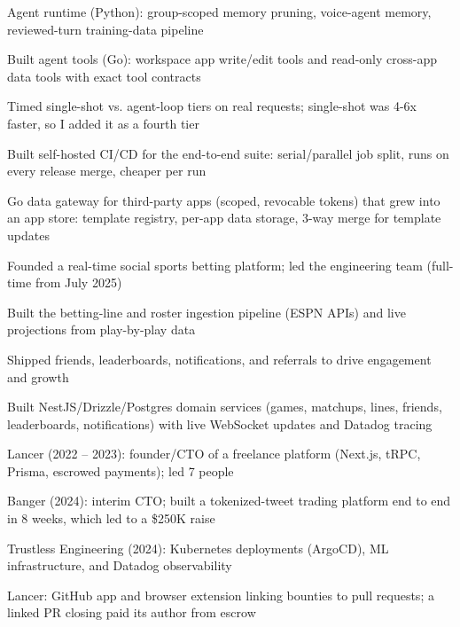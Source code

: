 \documentclass[print]{jack-resume}
\begin{document}
\begin{tightemize}
    \item Agent runtime (Python): group-scoped memory pruning, voice-agent memory, reviewed-turn training-data pipeline
    \item Built agent tools (Go): workspace app write/edit tools and read-only cross-app data tools with exact tool contracts
    \item Timed single-shot vs. agent-loop tiers on real requests; single-shot was 4-6x faster, so I added it as a fourth tier
    \item Built self-hosted CI/CD for the end-to-end suite: serial/parallel job split, runs on every release merge, cheaper per run
    \item Go data gateway for third-party apps (scoped, revocable tokens) that grew into an app store: template registry, per-app data storage, 3-way merge for template updates
\end{tightemize}
\sectionsep

\begin{tightemize}
    \item Founded a real-time social sports betting platform; led the engineering team (full-time from July 2025)
    \item Built the betting-line and roster ingestion pipeline (ESPN APIs) and live projections from play-by-play data
    \item Shipped friends, leaderboards, notifications, and referrals to drive engagement and growth
    \item Built NestJS/Drizzle/Postgres domain services (games, matchups, lines, friends, leaderboards, notifications) with live WebSocket updates and Datadog tracing
\end{tightemize}
\sectionsep

\begin{tightemize}
    \item Lancer (2022 -- 2023): founder/CTO of a freelance platform (Next.js, tRPC, Prisma, escrowed payments); led 7 people
    \item Banger (2024): interim CTO; built a tokenized-tweet trading platform end to end in 8 weeks, which led to a \$250K raise
    \item Trustless Engineering (2024): Kubernetes deployments (ArgoCD), ML infrastructure, and Datadog observability
    \item Lancer: GitHub app and browser extension linking bounties to pull requests; a linked PR closing paid its author from escrow
\end{tightemize}
\sectionsep
\end{document}
